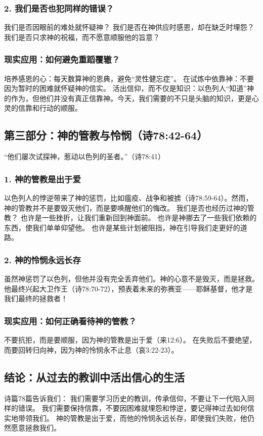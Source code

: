 \documentclass[a4paper, 12pt]{article}
\begin{document}
\subsubsection*{2. 我们是否也犯同样的错误？}
我们是否因眼前的难处就怀疑神？
我们是否在神供应时感恩，却在缺乏时埋怨？
我们是否只求神的祝福，而不愿意顺服他的旨意？
\subsubsection*{现实应用：如何避免重蹈覆辙？}
培养感恩的心：每天数算神的恩典，避免“灵性健忘症”。
在试炼中依靠神：不要因为暂时的困难就怀疑神的信实。
活出信仰，而不仅是知识：以色列人“知道”神的作为，但他们并没有真正信靠神。今天，我们需要的不只是头脑的知识，更是心灵的信靠和行动的顺服。
\subsection*{第三部分：神的管教与怜悯（诗78:42-64）}
“他们屡次试探神，惹动以色列的圣者。”（诗78:41）
\subsubsection*{1. 神的管教是出于爱}
以色列人的悖逆带来了神的惩罚，比如瘟疫、战争和被掳（诗78:59-64）。然而，神的管教并不是要毁灭他们，而是要唤醒他们的悔改。
我们是否也经历过神的管教？
也许是一些挫折，让我们重新回到神面前。
也许是神挪去了一些我们依赖的东西，使我们单单仰望他。
也许是某些计划被阻挡，神在引导我们走更好的道路。
\subsubsection*{2. 神的怜悯永远长存}
虽然神惩罚了以色列，但他并没有完全丢弃他们。神的心意不是毁灭，而是拯救。 他最终兴起大卫作王（诗78:70-72），预表着未来的弥赛亚——耶稣基督，他才是我们最终的拯救者！
\subsubsection*{现实应用：如何正确看待神的管教？}
不要抗拒，而是要顺服，因为神的管教是出于爱（来12:6）。
在失败后不要绝望，而要回转归向神，因为神的怜悯永不止息（哀3:22-23）。
\subsection*{结论：从过去的教训中活出信心的生活}
诗篇78篇告诉我们：
我们需要学习历史的教训，传承信仰，不要让下一代陷入同样的错误。
我们需要保持信靠，不要因困难就埋怨和悖逆，要记得神过去如何信实地带领我们。
神的管教是出于爱，而他的怜悯永远长存，即使我们失败，他仍然愿意拯救我们。
\end{document}
